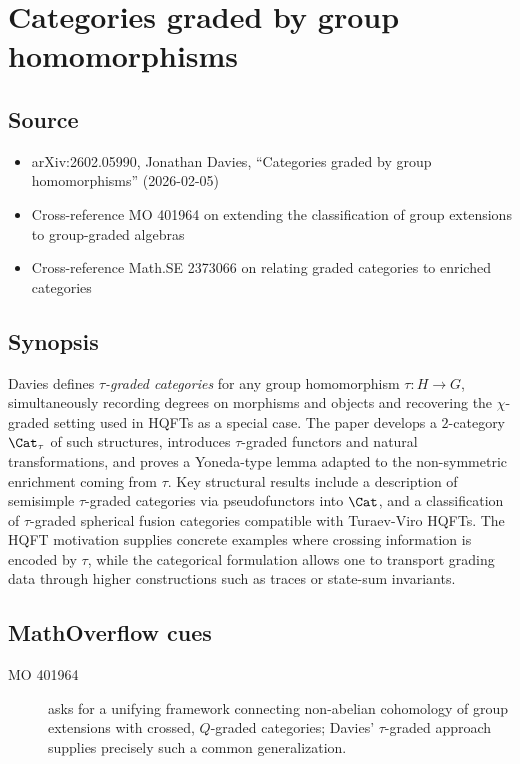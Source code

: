 \section*{Categories graded by group homomorphisms}
\subsection*{Source}
\begin{itemize}
  \item arXiv:2602.05990, Jonathan Davies, ``Categories graded by group homomorphisms'' (2026-02-05)
  \item Cross-reference MO 401964 on extending the classification of group extensions to group-graded algebras
  \item Cross-reference Math.SE 2373066 on relating graded categories to enriched categories
\end{itemize}
\subsection*{Synopsis}
Davies defines \emph{$\tau$-graded categories} for any group homomorphism $\tau:H\to G$, simultaneously recording degrees on morphisms and objects and recovering the $\chi$-graded setting used in HQFTs as a special case. The paper develops a $2$-category $\Cat_\tau$ of such structures, introduces $\tau$-graded functors and natural transformations, and proves a Yoneda-type lemma adapted to the non-symmetric enrichment coming from $\tau$. Key structural results include a description of semisimple $\tau$-graded categories via pseudofunctors into $\Cat$, and a classification of $\tau$-graded spherical fusion categories compatible with Turaev-Viro HQFTs. The HQFT motivation supplies concrete examples where crossing information is encoded by $\tau$, while the categorical formulation allows one to transport grading data through higher constructions such as traces or state-sum invariants.
\subsection*{MathOverflow cues}
\begin{description}
  \item[MO 401964] asks for a unifying framework connecting non-abelian cohomology of group extensions with crossed, $Q$-graded categories; Davies' $\tau$-graded approach supplies precisely such a common generalization.
\end{description}
